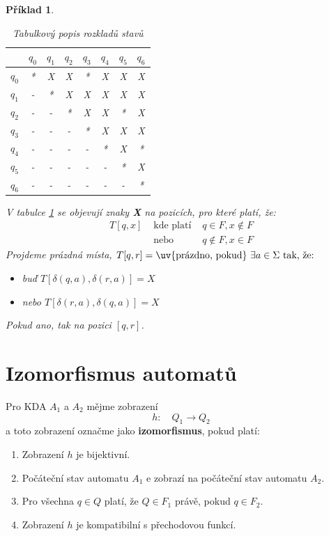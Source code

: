 \documentclass[10pt, a4paper, titlepage]{article}
\theoremstyle{note}
\newtheorem{priklad}{Příklad}
\begin{document}
\begin{priklad}
\begin{center}
\vspace*{30px}
\begin{table}[h]
\begin{center}
\begin{tabular}{c||c|c|c|c|c|c|c}
& $q_0$ & $q_1$ & $q_2$ & $q_3$ & $q_4$ & $q_5$ & $q_6$ \\
\hline
$q_0$ & * & X & X & * & X & X & X \\
\hline
$q_1$ & - & * & X & X & X & X & X \\
\hline
$q_2$ & - & - & * & X & X & * & X \\
\hline
$q_3$ & - & - & - & * & X & X & X \\
\hline
$q_4$ & - & - & - & - & * & X & * \\
\hline
$q_5$ & - & - & - & - & - & * & X \\
\hline
$q_6$ & - & - & - & - & - & - & * \\
\end{tabular}
\end{center}
\caption{Tabulkový popis rozkladů stavů}\label{tabulka-x}
\end{table}
\end{center}
V tabulce \ref{tabulka-x} se objevují znaky \textbf{X} na pozicích, pro které platí, že:
\begin{eqnarray*}
T[q,x] &\text{ kde platí }& q \in F, x \notin F \\
&\text{ nebo }& q \notin F, x \in F
\end{eqnarray*}
Projdeme pr\'azdn\'a m\'ista, $T[q,r] = \text{\uv{pr\'azdno, pokud} } \exists a \in \Sigma \text{ tak, že:}$
\begin{itemize}
\item
buď $T[\delta(q,a),\delta(r,a)] = X$
\item
nebo $T[\delta(r,a),\delta(q,a)] = X$
\end{itemize}
Pokud ano, tak  na pozici $[q,r]$.
\end{priklad}

\section{Izomorfismus automatů}
Pro KDA $A_1$ a $A_2$ mějme zobrazen\'i
$$
h: \quad Q_1 \rightarrow Q_2
$$
a toto zobrazení označme jako \textbf{izomorfismus}, pokud platí:
\begin{enumerate}
\item
Zobrazení $h$ je bijektivní.
\item
Počáteční stav automatu $A_1$ e zobrazí na počáteční stav automatu $A_2$.
\item
Pro všechna $q \in Q$ platí, že $Q \in F_1$ právě, pokud $q \in F_2$.
\item
Zobrazení $h$ je kompatibilní s přechodovou funkcí.
\end{enumerate}
\end{document}
